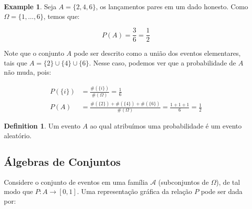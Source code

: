 \documentclass[
]{article}
\theoremstyle{definition}
\newtheorem{definition}{Definition}[section]
\theoremstyle{definition}
\newtheorem{example}{Example}[section]
\theoremstyle{definition}
\theoremstyle{definition}
\theoremstyle{remark}
\begin{document}
\begin{example}
Seja \(A = \{2,4,6\}\), os lançamentos pares em um dado honesto. Como \(\Omega = \{1,\dots,6\}\), temos que:

\[P(A) = \frac{3}{6} = \frac{1}{2}\]

Note que o conjunto \(A\) pode ser descrito como a união dos eventos elementares, tais que \(A = \{2\} \cup \{4\} \cup \{6\}\). Nesse caso, podemos ver que a probabilidade de \(A\) não muda, pois:

\begin{align*}
P(\{i\}) &= \frac{\#(\{i\})}{\#(\Omega)} = \frac{1}{6}\\
P(A) &= \frac{\#(\{2\})+\#(\{4\})+\#(\{6\})}{\#(\Omega)} = \frac{1+1+1}{6} = \frac{1}{2}
\end{align*}
\end{example}

\begin{definition}
Um evento \(A\) ao qual atribuímos uma probabilidade é um evento aleatório.
\end{definition}

\hypertarget{uxe1lgebras-de-conjuntos}{%
\subsection{Álgebras de Conjuntos}\label{uxe1lgebras-de-conjuntos}}

Considere o conjunto de eventos em uma família \(\mathcal{A}\) (subconjuntos de \(\Omega\)), de tal modo que \(P:A \to [0,1]\). Uma representação gráfica da relação \(P\) pode ser dada por:

\begin{center}
\end{center}
\end{document}
